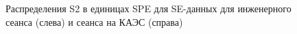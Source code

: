 \begin{figure}[H]
  \begin{minipage}[ht]{0.49\linewidth}    
  \end{minipage}
  \hfill
  \begin{minipage}[ht]{0.49\linewidth}  
  \end{minipage}
  \caption{Распределения S2 в единицах SPE для SE-данных для инженерного сеанса (слева) и сеанса на КАЭС (справа)}
  \label{img:sespesp}  
\end{figure}

